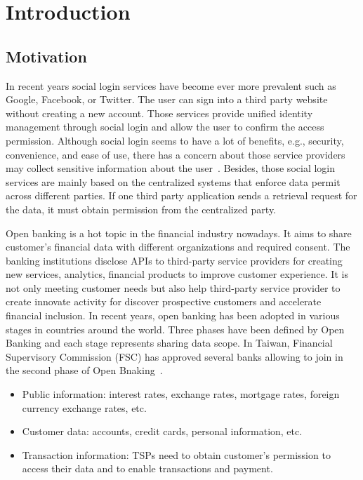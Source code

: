 \chapter{Introduction}
\label{chapter:intro}
\section{Motivation}
In recent years social login services have become ever more prevalent such as Google, Facebook, or Twitter. The user can sign into a third party website without creating a new account. Those services provide unified identity management through social login and allow the user to confirm the access permission. Although social login seems to have a lot of benefits, e.g., security, convenience, and ease of use, there has a concern about those service providers may collect sensitive information about the user~\cite{gafni2014social}.
Besides, those social login services are mainly based on the centralized systems that enforce data permit across different parties. If one third party application sends a retrieval request for the data, it must obtain permission from the centralized party.\par
Open banking is a hot topic in the financial industry nowadays. It aims to share customer's financial data with different organizations and required consent. The banking institutions disclose APIs to third-party service providers for creating new services, analytics, financial products to improve customer experience. It is not only meeting customer needs but also help third-party service provider to create innovate activity for discover prospective customers and accelerate financial inclusion. In recent years, open banking has been adopted in various stages in countries around the world. Three phases have been defined by Open Banking and each stage represents sharing data scope. In Taiwan, Financial Supervisory Commission (FSC) has approved several banks allowing to join in the second phase of Open Bnaking~\cite{thepaypers_2021}.\par

\begin{itemize}
    \item Public information: interest rates, exchange rates, mortgage rates, foreign currency exchange rates, etc.
    \item Customer data: accounts, credit cards, personal information, etc.
    \item Transaction information: TSPs need to obtain customer's permission to access their data and to enable transactions and payment.
\end{itemize}\par

